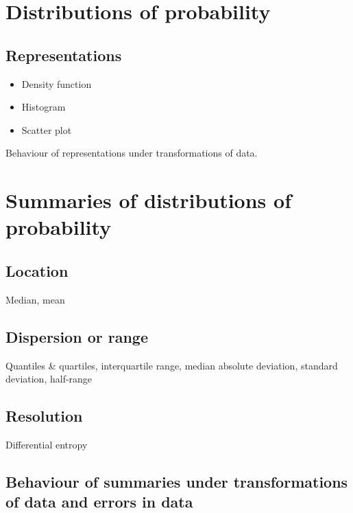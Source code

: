 \documentclass[
  letterpaper,
  DIV=11,
  numbers=noendperiod,
  oneside]{scrreprt}
\begin{document}
\hypertarget{distributions-of-probability}{%
\section{Distributions of
probability}\label{distributions-of-probability}}

\hypertarget{representations}{%
\subsection{Representations}\label{representations}}

\begin{itemize}
\item
  Density function
\item
  Histogram
\item
  Scatter plot
\end{itemize}

Behaviour of representations under transformations of data.

\hypertarget{summaries-of-distributions-of-probability}{%
\section{Summaries of distributions of
probability}\label{summaries-of-distributions-of-probability}}

\hypertarget{location}{%
\subsection{Location}\label{location}}

Median, mean

\hypertarget{dispersion-or-range}{%
\subsection{Dispersion or range}\label{dispersion-or-range}}

Quantiles \& quartiles, interquartile range, median absolute deviation,
standard deviation, half-range

\hypertarget{resolution}{%
\subsection{Resolution}\label{resolution}}

Differential entropy

\hypertarget{behaviour-of-summaries-under-transformations-of-data-and-errors-in-data}{%
\subsection{Behaviour of summaries under transformations of data and
errors in
data}\label{behaviour-of-summaries-under-transformations-of-data-and-errors-in-data}}
\end{document}
